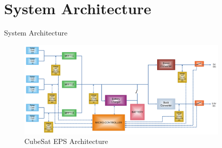 \documentclass[aspectratio=169]{beamer}
\begin{document}
		
		

%	
%	
%
%	
%	



	\section{System Architecture}
	\begin{frame}{System Architecture}
		
		\begin{figure}[h]
			\centering
			\includegraphics[width=0.9\textwidth]{diag/Architecture.pdf}
			\caption{CubeSat EPS Architecture}
			\label{fig:mesh1}
		\end{figure}
		
		
	\end{frame}
	
\end{document}
